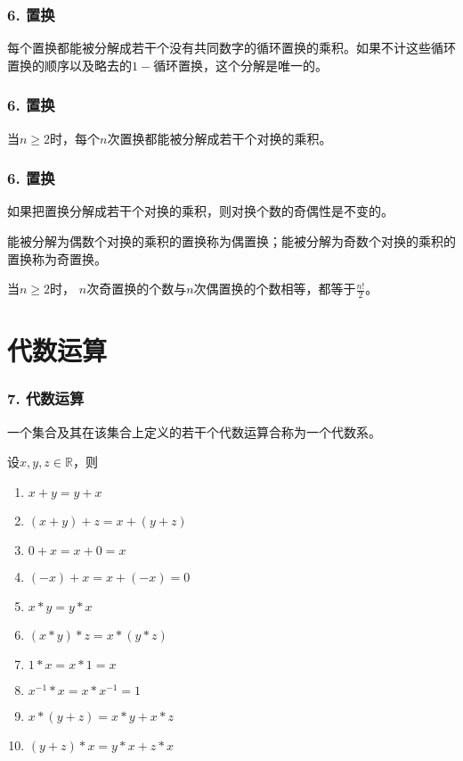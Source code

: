 \documentclass{beamer}
\begin{document}
\begin{CJK*}{UTF8}{gbsn}
 \begin{frame}
   \frametitle{6. 置换}
   \begin{Thm}
    每个置换都能被分解成若干个没有共同数字的循环置换的乘积。如果不计这些循环置换的顺序以及略去的$1-$循环置换，这个分解是唯一的。
   \end{Thm}
 \end{frame}

 \begin{frame}
   \frametitle{6. 置换}
   \begin{Thm}
    当$n\geq 2$时，每个$n$次置换都能被分解成若干个对换的乘积。
   \end{Thm}
 \end{frame}

 \begin{frame}
   \frametitle{6. 置换}
   \begin{Thm}
    如果把置换分解成若干个对换的乘积，则对换个数的奇偶性是不变的。
  \end{Thm}
  \pause
  \begin{Def}
    能被分解为偶数个对换的乘积的置换称为\alert{偶置换}；能被分解为奇数个对换的乘积的置换称为\alert{奇置换}。
  \end{Def}
  \pause
  \begin{Thm}
    当$n \geq 2$时， $n$次奇置换的个数与$n$次偶置换的个数相等，都等于$\frac{n!}{2}$。
  \end{Thm}
 \end{frame}

 
\section{代数运算}
\begin{frame}
  \frametitle{7. 代数运算}
  \begin{Def}
    一个集合及其在该集合上定义的若干个代数运算合称为一个\alert{代数系}。
  \end{Def}

  \begin{Thm}
    设$x, y, z \in \mathbb{R}$，则
   \begin{enumerate}
   \item   $x + y = y + x$
   \item   $(x + y) + z = x + (y + z)$
   \item   $0 + x = x + 0 = x$
   \item   $(-x) + x =x + (-x) = 0$
   \item   $x * y = y * x$
   \item   $(x * y) * z = x * (y *z)$
   \item   $1 * x = x * 1 = x$
   \item   $x^{-1} * x = x * x^{-1} = 1$
   \item   $x* (y + z) = x * y + x * z$
   \item   $(y + z) * x = y * x + z * x$
    \end{enumerate}
  \end{Thm}
\end{frame}
 

\end{CJK*}
\end{document}

